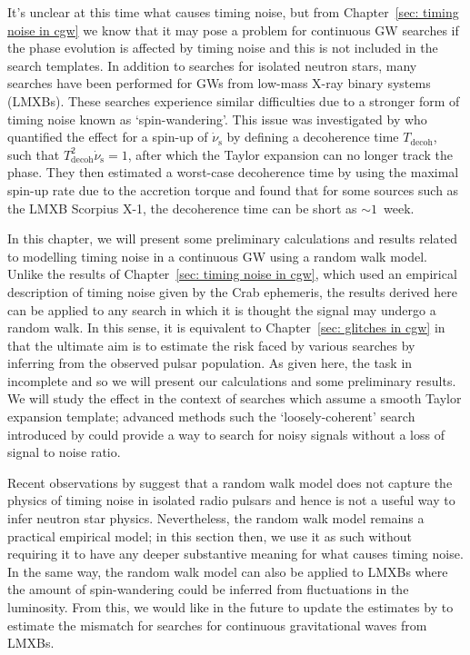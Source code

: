 \documentclass[../full_thesis/full_thesis.tex]{subfiles}
\begin{document}
It's unclear at this time what causes timing noise, but from
Chapter~\ref{sec: timing noise in cgw} we know that it may pose a problem for
continuous GW searches if the phase evolution is affected by timing noise and
this is not included in the search templates. In addition to searches for
isolated neutron stars, many searches \citep[see for
example][]{aasi2015directed,leaci2015,ScoX1:MDC1} have been performed for GWs from
low-mass X-ray binary systems (LMXBs). These searches experience similar
difficulties due to a stronger form of timing noise known as `spin-wandering'.
This issue was investigated by \citet{watts2008} who quantified the effect for
a spin-up of $\dot{\nu}_{\textrm{s}}$ by defining a decoherence time $T_{\mathrm{decoh}}$,
such that $T_{\mathrm{decoh}}^{2} \dot{\nu}_{\textrm{s}} = 1$, after which the Taylor
expansion can no longer track the phase.  They then estimated a worst-case
decoherence time by using the maximal spin-up rate due to the accretion torque
and found that for some sources such as the LMXB Scorpius X-1, the decoherence
time can be short as $\sim 1$~week.

In this chapter, we will present some preliminary calculations and results
related to modelling timing noise in a continuous GW using a random walk model.
Unlike the results of Chapter~\ref{sec: timing noise in cgw}, which used an
empirical description of timing noise given by the Crab ephemeris, the results
derived here can be applied to any search in which it is thought the signal may
undergo a random walk. In this sense, it is equivalent to Chapter~\ref{sec:
glitches in cgw} in that the ultimate aim is to estimate the risk faced by
various searches by inferring from the observed pulsar population.  As given
here, the task in incomplete and so we will present our calculations and
some preliminary results. We will study the effect in the context of searches
which assume a smooth Taylor expansion template; advanced methods such the
`loosely-coherent' search introduced by \citet{dergachev2010blind} could provide
a way to search for noisy signals without a loss of signal to noise ratio.

Recent observations by \citet{Hobbs2010} suggest that a random walk model does
not capture the physics of timing noise in isolated radio pulsars and hence is
not a useful way to infer neutron star physics. Nevertheless, the random walk
model remains a practical empirical model; in this section then, we use it as
such without requiring it to have any deeper substantive meaning for what
causes timing noise. In the same way, the random walk model can also be applied
to LMXBs where the amount of spin-wandering could be inferred from fluctuations
in the luminosity. From this, we would like in the future to update the estimates by
\citet{watts2008} to estimate the mismatch for searches for continuous gravitational
waves from LMXBs.
\end{document}
